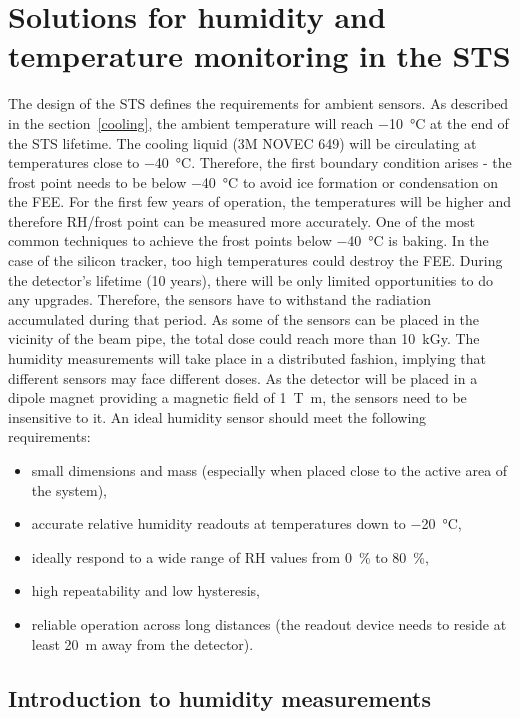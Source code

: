 \chapter{Solutions for humidity and temperature monitoring in the STS}
The design of the \gls{STS} \cite{Heuser:54798} defines the requirements for ambient sensors. As described in the section~\ref{cooling}, the ambient temperature will reach \SI{-10}{\celsius} at the end of the \gls{STS} lifetime. The cooling liquid (3M NOVEC 649) will be circulating at temperatures close to \SI{-40}{\celsius}. Therefore, the first boundary condition arises - the frost point needs to be below \SI{-40}{\celsius} to avoid ice formation or condensation on the \gls{FEE}. For the first few years of operation, the temperatures will be higher and therefore RH/frost point can be measured more accurately. One of the most common techniques to achieve the frost points below \SI{-40}{\celsius} is baking. In the case of the silicon tracker, too high temperatures could destroy the \gls{FEE}. 
During the detector's lifetime (10 years), there will be only limited opportunities to do any upgrades. Therefore, the sensors have to withstand the radiation accumulated during that period. As some of the sensors can be placed in the vicinity of the beam pipe, the total dose could reach more than 10~kGy. The humidity measurements will take place in a distributed fashion, implying that different sensors may face different doses. As the detector will be placed in a dipole magnet providing a magnetic field of \SI{1}{\tesla\metre}, the sensors need to be insensitive to it. An ideal humidity sensor should meet the following requirements:
\begin{itemize}
    \item small dimensions and mass (especially when placed close to the active area of the system),
    \item accurate relative humidity readouts at temperatures down to \SI{-20}{\celsius}, 
    \item ideally respond to a wide range of \gls{RH} values from 0~\% to 80~\%,
    \item high repeatability and low hysteresis,
    \item reliable operation across long distances (the readout device needs to reside at least \SI{20}{\metre} away from the detector).
\end{itemize}

\section{Introduction to humidity measurements}


